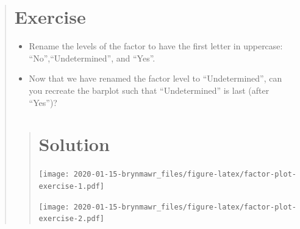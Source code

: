 \documentclass[]{book}
\newenvironment{Shaded}{\begin{snugshade}}{\end{snugshade}}
\newcommand{\KeywordTok}[1]{\textcolor[rgb]{0.13,0.29,0.53}{\textbf{#1}}}
\newcommand{\DataTypeTok}[1]{\textcolor[rgb]{0.13,0.29,0.53}{#1}}
\newcommand{\StringTok}[1]{\textcolor[rgb]{0.31,0.60,0.02}{#1}}
\newcommand{\OperatorTok}[1]{\textcolor[rgb]{0.81,0.36,0.00}{\textbf{#1}}}
\newcommand{\NormalTok}[1]{#1}
\begin{document}
\begin{quote}
\section{Exercise}\label{exercise-16}

\begin{itemize}
\item
  Rename the levels of the factor to have the first letter in uppercase:
  ``No'',``Undetermined'', and ``Yes''.
\item
  Now that we have renamed the factor level to ``Undetermined'', can you
  recreate the barplot such that ``Undetermined'' is last (after
  ``Yes'')?
\end{itemize}

\begin{quote}
\section{Solution}\label{solution-18}

\begin{Shaded}
\end{Shaded}

\texttt{[image: 2020-01-15-brynmawr\_files/figure-latex/factor-plot-exercise-1.pdf]}

\begin{Shaded}
\end{Shaded}

\texttt{[image: 2020-01-15-brynmawr\_files/figure-latex/factor-plot-exercise-2.pdf]}
\end{quote}
\end{quote}
\end{document}
